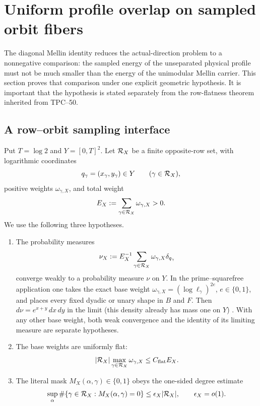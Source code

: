 \section{Uniform profile overlap on sampled orbit fibers}
\label{sec:tpc52-profile-overlap}

The diagonal Mellin identity reduces the actual-direction problem to a
nonnegative comparison: the sampled energy of the unseparated physical
profile must not be much smaller than the energy of the unimodular Mellin
carrier.  This section proves that comparison under one explicit geometric
hypothesis.  It is important that the hypothesis is stated separately from
the row-flatness theorem inherited from TPC--50.

\subsection{A row--orbit sampling interface}

Put \(T=\log 2\) and \(Y=[0,T]^2\).  Let \(\mathcal R_X\) be a finite
opposite-row set, with logarithmic coordinates
\[
 q_\gamma=(x_\gamma,y_\gamma)\in Y
 \qquad(\gamma\in\mathcal R_X),
\]
positive weights \(\omega_{\gamma,X}\), and total weight
\begin{equation}
 E_X:=\sum_{\gamma\in\mathcal R_X}\omega_{\gamma,X}>0.
 \label{eq:tpc52-opposite-row-energy}
\end{equation}
We use the following three hypotheses.

\begin{enumerate}[label=\textup{(S\arabic*)},leftmargin=3.2em]
 \item The probability measures
 \begin{equation}
  \nu_X:=E_X^{-1}\sum_{\gamma\in\mathcal R_X}
           \omega_{\gamma,X}\delta_{q_\gamma}
  \label{eq:tpc52-row-empirical-measure}
 \end{equation}
  converge weakly to a probability measure \(\nu\) on \(Y\).  In the
  prime--squarefree application one takes the exact base weight
  \(\omega_{\gamma,X}=(\log\ell_\gamma)^{2e}\), \(e\in\{0,1\}\), and
  places every fixed dyadic or unary shape in \(B\) and \(F\).  Then
  \(d\nu=e^{x+y}\,dx\,dy\) in the limit (this density already has mass
  one on \(Y\)) \citep{WangTPC51}.  With any other base weight, both
  weak convergence and the identity of its limiting measure are separate
  hypotheses.
 \item The base weights are uniformly flat:
 \begin{equation}
  |\mathcal R_X|\max_{\gamma\in\mathcal R_X}\omega_{\gamma,X}
  \le C_{\rm flat}E_X.
  \label{eq:tpc52-row-flatness}
 \end{equation}
 \item The literal mask \(M_X(\alpha,\gamma)\in\{0,1\}\) obeys the
 one-sided degree estimate
 \begin{equation}
  \sup_\alpha\#\{\gamma\in\mathcal R_X:M_X(\alpha,\gamma)=0\}
  \le\epsilon_X|\mathcal R_X|,
  \qquad \epsilon_X=o(1).
  \label{eq:tpc52-mask-degree}
 \end{equation}
\end{enumerate}

